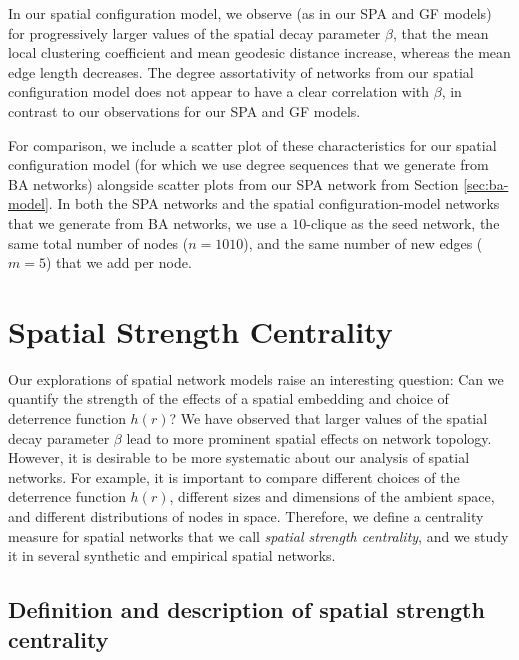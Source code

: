 \documentclass[%
 reprint,
 amsmath,amssymb,
 aps,
]{revtex4-1}
\begin{document}
 
In our spatial configuration model, we observe (as in our SPA and GF models) for progressively larger values of the spatial decay parameter $\beta$, that the mean local clustering coefficient and mean geodesic distance increase, whereas the mean edge length decreases. The degree assortativity of networks from our spatial configuration model does not appear to have a clear correlation with $\beta$, in contrast to our observations for our SPA and GF models.

For comparison, we include a scatter plot of these characteristics for our spatial configuration model (for which we use degree sequences that we generate from BA networks)  alongside scatter plots from our SPA network from Section \ref{sec:ba-model}. In both the SPA networks and the spatial configuration-model networks that we generate from BA networks, we use a $10$-clique as the seed network, the same total number of nodes ($n=1010$), and the same number of new edges ($m=5$) that we add per node.


\section{Spatial Strength Centrality} \label{sec:spatial_strength}

Our explorations of spatial network models raise an interesting question: Can we quantify the strength of the effects of a spatial embedding and choice of 
deterrence 
function $h(r)$? We have observed that larger values of the spatial decay parameter $\beta$ lead to more prominent spatial effects on network topology. However, it is desirable to be more systematic about our analysis of spatial networks. For example, it is important to compare different choices of the deterrence function $h(r)$, different sizes and dimensions of the ambient space, and different distributions of nodes in space. Therefore, we define a centrality measure for spatial networks that we call \emph{spatial strength centrality}, and we study it in several synthetic and empirical spatial networks.


\subsection{Definition and description of spatial strength centrality}
\end{document}
